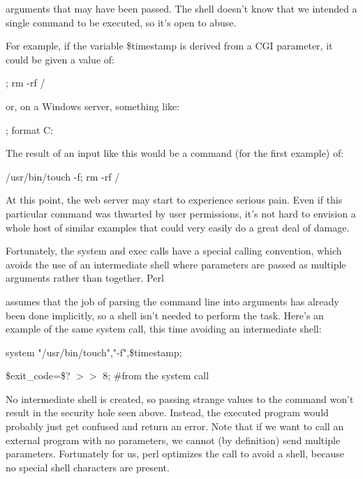 \documentclass[a4paper,11pt]{book}
\begin{document}
\noindent arguments that may have been passed. The shell doesn't know that we intended a single command to be executed, so it's open to abuse.

\noindent 

\noindent For example, if the variable \$timestamp is derived from a CGI parameter, it could be given a value of:

\noindent 

\noindent 

\noindent ; rm -rf /

\noindent 

\noindent or, on a Windows server, something like:

\noindent 

\noindent 

\noindent ; format C:

\noindent 

\noindent The result of an input like this would be a command (for the first example) of:

\noindent 

\noindent 

\noindent /usr/bin/touch -f; rm -rf /

\noindent 

\noindent At this point, the web server may start to experience serious pain. Even if this particular command was thwarted by user permissions, it's not hard to envision a whole host of similar examples that could very easily do a great deal of damage.

\noindent 

\noindent Fortunately, the system and exec calls have a special calling convention, which avoids the use of an intermediate shell where parameters are passed as multiple arguments rather than together. Perl

\noindent assumes that the job of parsing the command line into arguments has already been done implicitly, so a shell isn't needed to perform the task. Here's an example of the same system call, this time avoiding an intermediate shell:

\noindent 

\noindent 

\noindent system "/usr/bin/touch","-f",\$timestamp;

\noindent \$exit\_code=\$? $>$$>$ 8; \#from the system call

\noindent 

\noindent No intermediate shell is created, so passing strange values to the command won't result in the security hole seen above. Instead, the executed program would probably just get confused and return an error. Note that if we want to call an external program with no parameters, we cannot (by definition) send multiple parameters. Fortunately for us, perl optimizes the call to avoid a shell, because no special shell characters are present.
\end{document}

